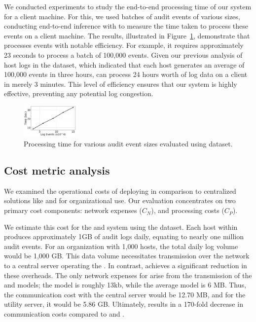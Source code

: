  We conducted experiments to study the end-to-end processing time of our system for a client machine. For this, we used batches of audit events of various sizes, conducting end-to-end inference with \Sys to measure the time taken to process these events on a client machine. The results, illustrated in Figure~\ref{sizevstime}, demonstrate that \Sys processes events with notable efficiency. For example, it requires approximately 23 seconds to process a batch of 100,000 events. Given our previous analysis of host logs in the \optc dataset, which indicated that each host generates an average of 100,000 events in three hours, \Sys can process 24 hours worth of log data on a client in merely 3 minutes. This level of efficiency ensures that our system is highly effective, preventing any potential log congestion.

 \begin{figure}[!t]
  \centering
  \includegraphics[width=0.25\textwidth]{fig/sizevstime.pdf}
  \caption{Processing time for various audit event sizes evaluated using \optc dataset.}
  \label{sizevstime}
  \vspace{-2ex}
\end{figure}

\subsection{Cost metric analysis}
\label{cost_metric}
We examined the operational costs of deploying \Sys in comparison to centralized solutions like \flash and \kairos for organizational use. Our evaluation concentrates on two primary cost components: network expenses (\(C_{N}\)), and processing costs (\(C_{P}\)).

 We estimate this cost for the \flash and \kairos system using the \optc dataset. Each host within \optc produces approximately 1GB of audit logs daily, equating to nearly one million audit events. For an organization with 1,000 hosts, the total daily log volume would be 1,000 GB. This data volume necessitates transmission over the network to a central server operating the \pids. In contrast, \Sys achieves a significant reduction in these overheads. The only network expenses for \Sys arise from the transmission of the \gnnshort and \wordvec models; the \gnnshort model is roughly 13kb, while the average \wordvec model is 6 MB. Thus, the communication cost with the central server would be 12.70 MB, and for the utility server, it would be 5.86 GB. Ultimately, \Sys results in a 170-fold decrease in communication costs compared to \flash and \kairos.

